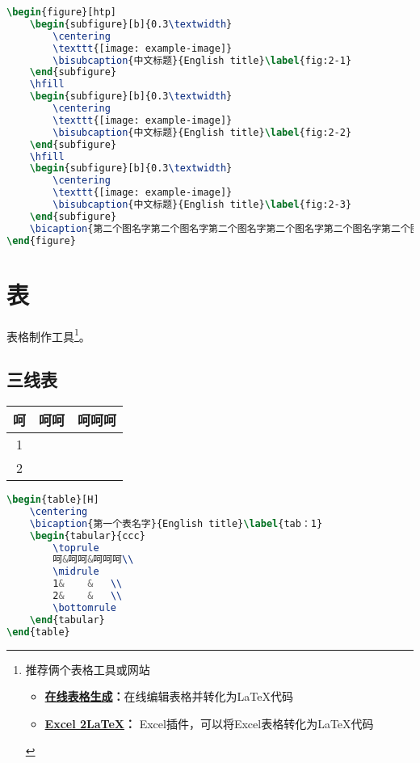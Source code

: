 \begin{lstlisting}[language=TeX]
\begin{figure}[htp]
	\begin{subfigure}[b]{0.3\textwidth}
		\centering
		\texttt{[image: example-image]}
		\bisubcaption{中文标题}{English title}\label{fig:2-1}
	\end{subfigure}
	\hfill
	\begin{subfigure}[b]{0.3\textwidth}
		\centering
		\texttt{[image: example-image]}
		\bisubcaption{中文标题}{English title}\label{fig:2-2}
	\end{subfigure}
	\hfill
	\begin{subfigure}[b]{0.3\textwidth}
		\centering
		\texttt{[image: example-image]}
		\bisubcaption{中文标题}{English title}\label{fig:2-3}
	\end{subfigure}
	\bicaption{第二个图名字第二个图名字第二个图名字第二个图名字第二个图名字第二个图名字第二个图名字第二个图名字第二个图名字第二个图名字}{English title}\label{fig:2}
\end{figure}
\end{lstlisting}

\section{表}
表格制作工具\footnote{推荐俩个表格工具或网站\begin{itemize}
		\item \textbf{\href{www.tablesgenerator.com}{在线表格生成}\;：}在线编辑表格并转化为\LaTeX 代码
		\item \textbf{\href{https://www.ctan.org/tex-archive/support/excel2latex/}{Excel 2\LaTeX}\;：
		}Excel插件，可以将Excel表格转化为\LaTeX 代码
\end{itemize}}。
\subsection{三线表}
\begin{table}[H]
	\centering
	\label{tab：1}
	\begin{tabular}{ccc}
		\toprule
		呵&呵呵&呵呵呵\\
		\midrule
		1&    &   \\
		2&    &   \\
		\bottomrule
	\end{tabular}
\end{table}
\begin{lstlisting}[language=TeX]
\begin{table}[H]
	\centering
	\bicaption{第一个表名字}{English title}\label{tab：1}
	\begin{tabular}{ccc}
		\toprule
		呵&呵呵&呵呵呵\\
		\midrule
		1&    &   \\
		2&    &   \\
		\bottomrule
	\end{tabular}
\end{table}
\end{lstlisting}

